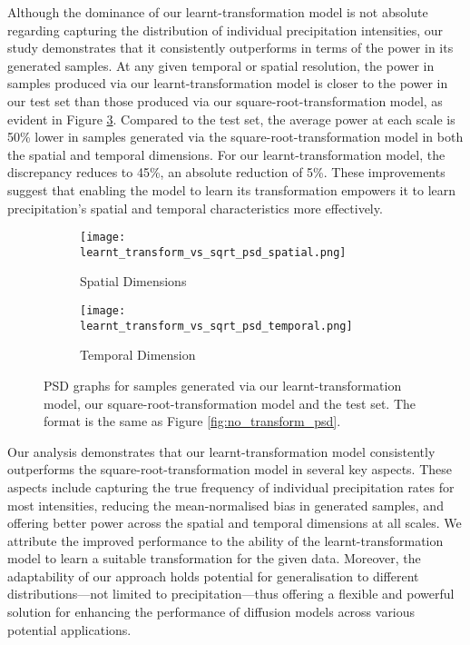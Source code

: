 \documentclass[ oneside,%
                    author={George Herbert},
                    degree={MSci},
                     title={Diffusion Models for Time-Evolving Precipitation Fields},
                  subtitle={}]{dissertation}
\begin{document}
Although the dominance of our learnt-transformation model is not absolute regarding capturing the distribution of individual precipitation intensities, our study demonstrates that it consistently outperforms in terms of the power in its generated samples. At any given temporal or spatial resolution, the power in samples produced via our learnt-transformation model is closer to the power in our test set than those produced via our square-root-transformation model, as evident in Figure \ref{fig:learnt_transform_vs_sqrt_psd}. Compared to the test set, the average power at each scale is 50\% lower in samples generated via the square-root-transformation model in both the spatial and temporal dimensions. For our learnt-transformation model, the discrepancy reduces to 45\%, an absolute reduction of 5\%. These improvements suggest that enabling the model to learn its transformation empowers it to learn precipitation's spatial and temporal characteristics more effectively.

\begin{figure}[htbp]
      \centering
      \begin{subfigure}{.49\textwidth}
            \texttt{[image: learnt\_transform\_vs\_sqrt\_psd\_spatial.png]}
            \caption{Spatial Dimensions}
            \label{fig:learnt_transform_vs_sqrt_psd_spatial}
      \end{subfigure}
      \begin{subfigure}{.49\textwidth}
            \texttt{[image: learnt\_transform\_vs\_sqrt\_psd\_temporal.png]}
            \caption{Temporal Dimension}
            \label{fig:learnt_transform_vs_sqrt_psd_temporal}
      \end{subfigure}
      \caption{PSD graphs for samples generated via our learnt-transformation model, our square-root-transformation model and the test set. The format is the same as Figure \ref{fig:no_transform_psd}.}
      \label{fig:learnt_transform_vs_sqrt_psd}
\end{figure}

Our analysis demonstrates that our learnt-transformation model consistently outperforms the square-root-transformation model in several key aspects. These aspects include capturing the true frequency of individual precipitation rates for most intensities, reducing the mean-normalised bias in generated samples, and offering better power across the spatial and temporal dimensions at all scales. We attribute the improved performance to the ability of the learnt-transformation model to learn a suitable transformation for the given data. Moreover, the adaptability of our approach holds potential for generalisation to different distributions---not limited to precipitation---thus offering a flexible and powerful solution for enhancing the performance of diffusion models across various potential applications.
\end{document}
